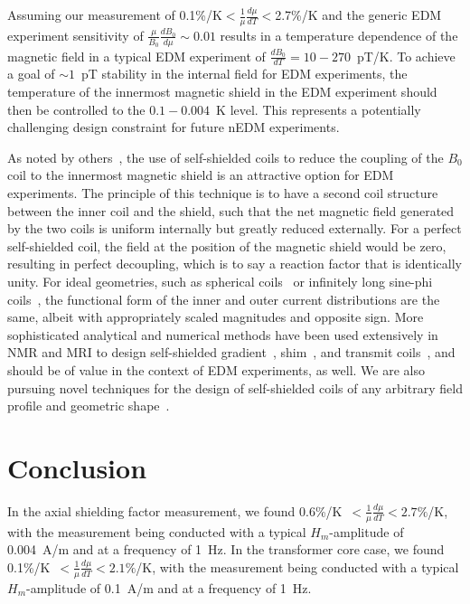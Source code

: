 \documentclass[review]{elsarticle}
\begin{document}
Assuming our measurement of
0.1\%/K$<\frac{1}{\mu}\frac{d\mu}{dT}<$2.7\%/K and the generic EDM
experiment sensitivity of $\frac{\mu}{B_0}\frac{dB_0}{d\mu}\sim 0.01$
results in a temperature dependence of the magnetic field in a typical
EDM experiment of $\frac{dB_0}{dT}=10-270$~pT/K.  To achieve a goal of
$\sim 1$~pT  stability in the internal field for EDM experiments, the
temperature of the innermost magnetic shield in the EDM experiment
should then be controlled to the $0.1-0.004$~K level.  This represents a
potentially challenging design constraint for future nEDM experiments.




As noted by others~\cite{bib:cpviolwithoutstrangeness}, the use of self-shielded coils  
to reduce the coupling of the $B_0$ coil to the innermost magnetic
shield is an attractive option for EDM experiments.    The principle of this technique
is to have a second coil structure between the inner coil and the shield, such that 
the net magnetic field generated by the two coils is uniform internally but  greatly reduced externally.  
For a perfect self-shielded coil, the field at the
position of the magnetic shield would be  zero, resulting in perfect decoupling, which is to say a reaction
factor that is identically unity.  For ideal geometries, such as spherical coils~\cite{bib:brown, bib:wheeler,bib:purcell} or infinitely long sine-phi coils~\cite{bib:bethBNL,bib:bethUSpatent,bib:bidinosti},  the functional form of the inner and outer current distributions are the same, albeit  with appropriately scaled magnitudes and opposite sign.  
More sophisticated analytical and numerical methods have been used extensively in NMR and MRI to design self-shielded gradient~\cite{bib:turner,bib:hidalgo}, shim~\cite{bib:brideson,bib:forbes}, and transmit coils~\cite{bib:bidinosti,bib:kuzmin},  and should be of value in the context of
 EDM experiments, as well.   We are also pursuing novel techniques for the design of self-shielded coils of any arbitrary field profile and geometric shape~\cite{bib:crawford}.



\section{Conclusion}

In the axial shielding factor measurement, we found
0.6\%/K~$<\frac{1}{\mu}\frac{d\mu}{dT}<2.7\%$/K, with the measurement
being conducted with a typical $H_m$-amplitude of 0.004~A/m and at a
frequency of 1~Hz.  In the transformer core case, we found
0.1\%/K~$<\frac{1}{\mu}\frac{d\mu}{dT}<2.1\%$/K, with the measurement
being conducted with a typical $H_m$-amplitude of 0.1~A/m and at a
frequency of 1~Hz.
\end{document}
